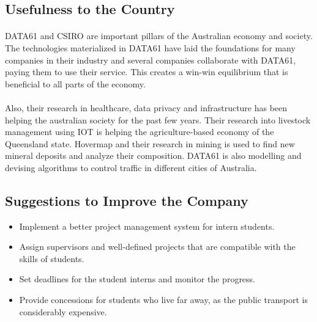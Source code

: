 \subsection{Usefulness to the Country}
\paragraph{}
DATA61 and CSIRO are important pillars of the Australian economy and society. The technologies materialized in DATA61 have laid the foundations for many companies in their industry and several companies collaborate with DATA61, paying them to use their service. This creates a win-win equilibrium that is beneficial to all parts of the economy.

\paragraph{}
Also, their research in healthcare, data privacy and infrastructure has been helping the australian society for the past few years. Their research into livestock management using IOT is helping the agriculture-based economy of the Queensland state. Hovermap and their research in mining is used to find new mineral deposits and analyze their composition. DATA61 is also modelling and devising algorithms to control traffic in different cities of Australia. 

\subsection{Suggestions to Improve the Company}
\begin{itemize}
    \item Implement a better project management system for intern students.
    \item Assign supervisors and well-defined projects that are compatible with the skills of students.
    \item Set deadlines for the student interns and monitor the progress.
    \item Provide concessions for students who live far away, as the public transport is considerably expensive.
\end{itemize}